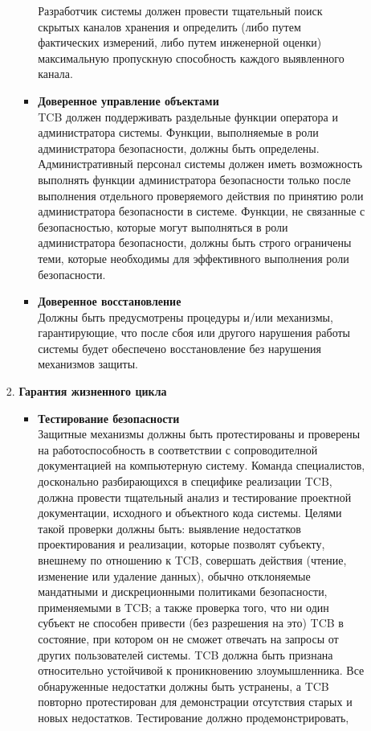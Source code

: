 \begin{enumerate}
\begin{enumerate}
\begin{enumerate}
\begin{itemize}
				Разработчик системы должен провести тщательный поиск скрытых каналов хранения и определить (либо путем фактических измерений, либо путем инженерной оценки)
				максимальную пропускную способность каждого выявленного канала.
				\item{\textbf{Доверенное управление объектами}}\\
				TCB должен поддерживать раздельные функции оператора и администратора системы. Функции, выполняемые в роли администратора безопасности, должны быть определены. 
				Административный персонал системы должен иметь возможность выполнять функции администратора безопасности только после выполнения отдельного проверяемого действия
				по принятию роли администратора безопасности в системе. Функции, не связанные с безопасностью, которые могут выполняться в роли администратора безопасности,
				должны быть строго ограничены теми, которые необходимы для эффективного выполнения роли безопасности.
				\item{\textbf{Доверенное восстановление}}\\
				Должны быть предусмотрены процедуры и/или механизмы, гарантирующие, что после сбоя или другого нарушения работы системы будет обеспечено восстановление без нарушения 
				механизмов защиты.
			\end{itemize}
			\item{\textbf{Гарантия жизненного цикла}}
			\begin{itemize}
				\item{\textbf{Тестирование безопасности}}\\
				Защитные механизмы должны быть протестированы и проверены на работоспособность в соответствии с сопроводителной документацией на компьютерную систему.  Команда специалистов,
				досконально разбирающихся в специфике реализации TCB, должна провести тщательный анализ и тестирование проектной документации, исходного и объектного кода системы. Целями такой
				проверки должны быть: выявление недостатков проектирования и реализации, которые позволят субъекту, внешнему по отношению к TCB, совершать действия (чтение, изменение или удаление данных),
				обычно отклоняемые мандатными и дискреционными политиками безопасности, применяемыми в TCB; а также проверка того, что ни один субъект не способен привести (без разрешения на это)
				TCB в состояние, при котором он не сможет отвечать на запросы от других пользователей системы. TCB должна быть признана относительно устойчивой к проникновению злоумышленника. 
				Все обнаруженные недостатки должны быть устранены, а TCB повторно протестирован для демонстрации отсутствия старых и новых недостатков. Тестирование должно продемонстрировать,

\end{itemize}
\end{enumerate}
\end{enumerate}
\end{enumerate}
